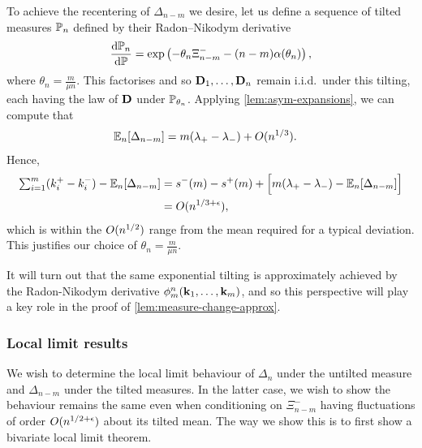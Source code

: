 To achieve the recentering of $\Delta_{n-m}$ we desire, let us define a sequence of tilted measures $\P_n$ defined by their Radon--Nikodym derivative
\begin{equation}
    \diff{\P_n}{\P} = \exp \left( - \theta_n \Xi^-_{n-m} - (n - m) \alpha(\theta_n) \right),
\end{equation}
where $\theta_n = \frac{m}{\mu n}$. This factorises and so $\vD_1, \ldots, \vD_n$ remain i.i.d.\ under this tilting, each having the law of $\vD$ under $\P_{\theta_n}$. Applying \cref{lem:asym-expansions}, we can compute that
\begin{align*}
    \E_n[\Delta_{n-m}] 
    &= m(\lambda_+ - \lambda_-) + \bigo(n^{1/3}).
\end{align*}
Hence,
\begin{align*}
    \textstyle \sum_{i=1}^m (k_i^+ - k_i^-) - \E_n[\Delta_{n-m}] 
    &= s^-(m) - s^+(m) + \Big[ m(\lambda_+ - \lambda_-) - \E_n[\Delta_{n-m}] \Big] \\
    &= \bigo(n^{1/3 + \epsilon}),
\end{align*}
which is within the $\bigo(n^{1/2})$ range from the mean required for a typical deviation. This justifies our choice of $\theta_n = \frac{m}{\mu n}$.

It will turn out that the same exponential tilting is approximately achieved by the Radon-Nikodym derivative $\phi^n_m(\vk_1, \ldots, \vk_m)$, and so this perspective will play a key role in the proof of \cref{lem:measure-change-approx}.

\subsubsection{Local limit results}

We wish to determine the local limit behaviour of $\Delta_n$ under the untilted measure and $\Delta_{n-m}$ under the tilted measures. In the latter case, we wish to show the behaviour remains the same even when conditioning on $\Xi_{n-m}^-$ having fluctuations of order $\bigo(n^{1/2 + \epsilon})$ about its tilted mean. The way we show this is to first show a bivariate local limit theorem.


